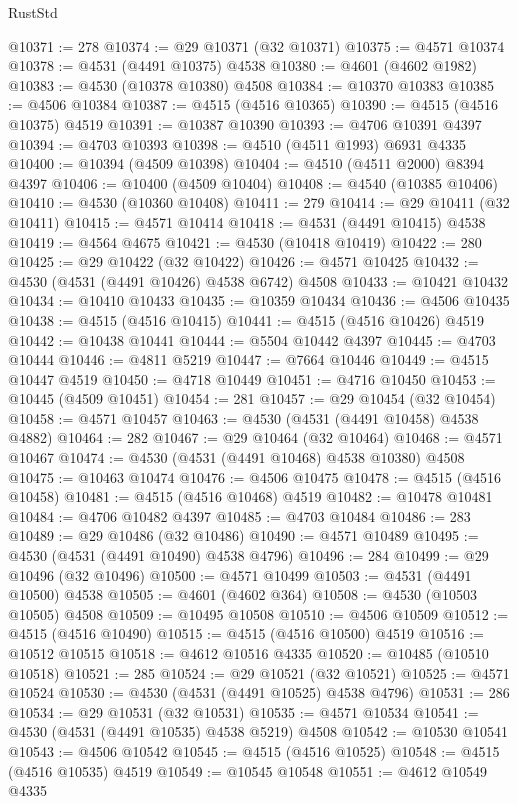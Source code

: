 \begin{lexlean}{RustStd}
\begin{coremodule}
{\begin{coremodule}
{{{{{{{{{{{{{{{{{{{{{{{{{{{{{{{{{{{{{{{{{{{{{{{{{{{{{{{@10371 := 278
@10374 := @29 @10371 (@32 @10371)
@10375 := @4571 @10374
@10378 := @4531 (@4491 @10375) @4538
@10380 := @4601 (@4602 @1982)
@10383 := @4530 (@10378 @10380) @4508
@10384 := @10370 @10383
@10385 := @4506 @10384
@10387 := @4515 (@4516 @10365)
@10390 := @4515 (@4516 @10375) @4519
@10391 := @10387 @10390
@10393 := @4706 @10391 @4397
@10394 := @4703 @10393
@10398 := @4510 (@4511 @1993) @6931 @4335
@10400 := @10394 (@4509 @10398)
@10404 := @4510 (@4511 @2000) @8394 @4397
@10406 := @10400 (@4509 @10404)
@10408 := @4540 (@10385 @10406)
@10410 := @4530 (@10360 @10408)
@10411 := 279
@10414 := @29 @10411 (@32 @10411)
@10415 := @4571 @10414
@10418 := @4531 (@4491 @10415) @4538
@10419 := @4564 @4675
@10421 := @4530 (@10418 @10419)
@10422 := 280
@10425 := @29 @10422 (@32 @10422)
@10426 := @4571 @10425
@10432 := @4530 (@4531 (@4491 @10426) @4538 @6742) @4508
@10433 := @10421 @10432
@10434 := @10410 @10433
@10435 := @10359 @10434
@10436 := @4506 @10435
@10438 := @4515 (@4516 @10415)
@10441 := @4515 (@4516 @10426) @4519
@10442 := @10438 @10441
@10444 := @5504 @10442 @4397
@10445 := @4703 @10444
@10446 := @4811 @5219
@10447 := @7664 @10446
@10449 := @4515 @10447 @4519
@10450 := @4718 @10449
@10451 := @4716 @10450
@10453 := @10445 (@4509 @10451)
@10454 := 281
@10457 := @29 @10454 (@32 @10454)
@10458 := @4571 @10457
@10463 := @4530 (@4531 (@4491 @10458) @4538 @4882)
@10464 := 282
@10467 := @29 @10464 (@32 @10464)
@10468 := @4571 @10467
@10474 := @4530 (@4531 (@4491 @10468) @4538 @10380) @4508
@10475 := @10463 @10474
@10476 := @4506 @10475
@10478 := @4515 (@4516 @10458)
@10481 := @4515 (@4516 @10468) @4519
@10482 := @10478 @10481
@10484 := @4706 @10482 @4397
@10485 := @4703 @10484
@10486 := 283
@10489 := @29 @10486 (@32 @10486)
@10490 := @4571 @10489
@10495 := @4530 (@4531 (@4491 @10490) @4538 @4796)
@10496 := 284
@10499 := @29 @10496 (@32 @10496)
@10500 := @4571 @10499
@10503 := @4531 (@4491 @10500) @4538
@10505 := @4601 (@4602 @364)
@10508 := @4530 (@10503 @10505) @4508
@10509 := @10495 @10508
@10510 := @4506 @10509
@10512 := @4515 (@4516 @10490)
@10515 := @4515 (@4516 @10500) @4519
@10516 := @10512 @10515
@10518 := @4612 @10516 @4335
@10520 := @10485 (@10510 @10518)
@10521 := 285
@10524 := @29 @10521 (@32 @10521)
@10525 := @4571 @10524
@10530 := @4530 (@4531 (@4491 @10525) @4538 @4796)
@10531 := 286
@10534 := @29 @10531 (@32 @10531)
@10535 := @4571 @10534
@10541 := @4530 (@4531 (@4491 @10535) @4538 @5219) @4508
@10542 := @10530 @10541
@10543 := @4506 @10542
@10545 := @4515 (@4516 @10525)
@10548 := @4515 (@4516 @10535) @4519
@10549 := @10545 @10548
@10551 := @4612 @10549 @4335
}}}}}}}}}}}}}}}}}}}}}}}}}}}}}}}}}}}}}}}}}}}}}}}}}}}}}}}
\end{coremodule}}
\end{coremodule}
\end{lexlean}
